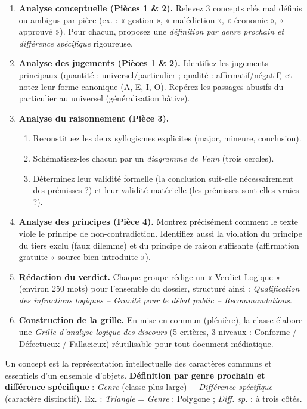 \documentclass[11pt]{article}
\newcommand{\cle}[1]{{\popxbold\color{popdark}#1}}
\newcounter{popsec}
\newcounter{popsub}
\newcommand{\courssub}[1]{%
  \stepcounter{popsub}%
  \par\vspace{9pt}\noindent{\popxbold\fontsize{11.5}{13}\selectfont\color{popink}{\color{poporange}\thepopsec.\thepopsub}\hspace{6pt}#1}\par\nopagebreak\vspace{4pt}
}
\begin{document}
\begin{enumerate}
    \item \textbf{Analyse conceptuelle (Pièces 1 \& 2).} Relevez 3 concepts clés mal définis ou ambigus par pièce (ex. : « gestion », « malédiction », « économie », « approuvé »). Pour chacun, proposez une \emph{définition par genre prochain et différence spécifique} rigoureuse.
    \item \textbf{Analyse des jugements (Pièces 1 \& 2).} Identifiez les jugements principaux (quantité : universel/particulier ; qualité : affirmatif/négatif) et notez leur forme canonique (A, E, I, O). Repérez les passages abusifs du particulier au universel (généralisation hâtive).
    \item \textbf{Analyse du raisonnement (Pièce 3).} 
    \begin{enumerate}
        \item Reconstituez les deux syllogismes explicites (major, mineure, conclusion).
        \item Schématisez-les chacun par un \emph{diagramme de Venn} (trois cercles).
        \item Déterminez leur \cle{validité} formelle (la conclusion suit-elle nécessairement des prémisses ?) et leur \cle{validité matérielle} (les prémisses sont-elles vraies ?).
    \end{enumerate}
    \item \textbf{Analyse des principes (Pièce 4).} Montrez précisément comment le texte viole le \cle{principe de non-contradiction}. Identifiez aussi la violation du \cle{principe du tiers exclu} (faux dilemme) et du \cle{principe de raison suffisante} (affirmation gratuite « source bien introduite »).
    \item \textbf{Rédaction du verdict.} Chaque groupe rédige un « Verdict Logique » (environ 250 mots) pour l'ensemble du dossier, structuré ainsi : \emph{Qualification des infractions logiques -- Gravité pour le débat public -- Recommandations}.
    \item \textbf{Construction de la grille.} En mise en commun (plénière), la classe élabore une \emph{Grille d'analyse logique des discours} (5 critères, 3 niveaux : Conforme / Défectueux / Fallacieux) réutilisable pour tout document médiatique.
\end{enumerate}

\courssub{Ressources à mobiliser}
\begin{definition}[Concept]
Un concept est la représentation intellectuelle des caractères communs et essentiels d'un ensemble d'objets. \textbf{Définition par genre prochain et différence spécifique} : \emph{Genre} (classe plus large) + \emph{Différence spécifique} (caractère distinctif). Ex. : \emph{Triangle} = \textit{Genre} : Polygone ; \textit{Diff. sp.} : à trois côtés.
\end{definition}
\end{document}
